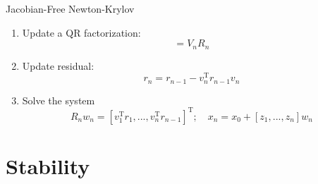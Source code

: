 \documentclass[10pt,t,xcolor=table,compress]{UWMadBeamer}
\begin{document}
\begin{frame}{Jacobian-Free Newton-Krylov}
{\begin{enumerate}
{            }
            \item{Update a QR factorization:
                \begin{equation}
                    [z_1, \frac{r(\qi^{p} + \varepsilon z_2) - r(\qi^{p})}{\varepsilon},...,\frac{r(\qi^{p} + \varepsilon z_n) - r(\qi^{p})}{\varepsilon}] = V_n R_n
                \end{equation}
            }
            \item{Update residual:
                \begin{equation}
                    r_n = r_{n-1} - v_n^{\text{T}} r_{n-1}  v_n
                \end{equation}
            }
            \item{Solve the system
                \begin{equation}
                    R_n w_n = [v_1^{\text{T}} r_{1} ,...,v_n^{\text{T}} r_{n-1}]^{\text{T}};
                    \quad
                    x_n = x_0 + [z_1,...,z_n]w_n
                \end{equation}
            }
        \end{enumerate}
        }
    \end{frame}





    \section{Stability}
\end{document}
